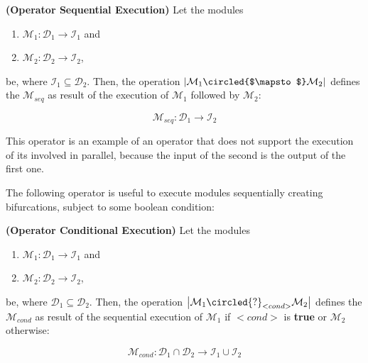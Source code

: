 
\begin{definition}\label{op:seqexec}
{\bf (Operator Sequential Execution)} Let the modules 
\begin{enumerate}%
	\item $\mathcal{M}_1 : \mathcal{D}_1 \rightarrow \mathcal{I}_1$ and 
	\item $\mathcal{M}_2 : \mathcal{D}_2 \rightarrow \mathcal{I}_2$, 
\end{enumerate}%
be, where $\mathcal{I}_1 \subseteq \mathcal{D}_2$. Then, the operation $\left|\mathcal{M}_1\circled{$\mapsto$} \mathcal{M}_2\right|$ defines the \cm{} $\mathcal{M}_{seq}$ as result of the execution of $\mathcal{M}_1$ followed by $\mathcal{M}_2$:

\[
\mathcal{M}_{seq}:\mathcal{D}_1 \rightarrow \mathcal{I}_2
\]
\end{definition}

This operator is an example of an operator that does not support the execution of its involved \cms{} in parallel, because the input of the second \cm{} is the output of the first one.

The following operator is useful to execute modules sequentially creating bifurcations, subject to some boolean condition:

\begin{definition}\label{op:conditional}
{\bf (Operator Conditional Execution)} Let the modules 
\begin{enumerate}%
	\item $\mathcal{M}_1 : \mathcal{D}_1 \rightarrow \mathcal{I}_1$ and  
	\item $\mathcal{M}_2 : \mathcal{D}_2 \rightarrow \mathcal{I}_2$,
\end{enumerate}%
be, where $\mathcal{D}_1 \subseteq \mathcal{D}_2$. %
Then, the operation $\left|\mathcal{M}_1\circled{?}_{<cond>}\mathcal{M}_2\right|$ defines the \cm{} $\mathcal{M}_{cond}$ as result of the sequential execution of $\mathcal{M}_1$ if $<cond>$ is {\bf true} or $\mathcal{M}_2$ otherwise:

\[
\mathcal{M}_{cond}:\mathcal{D}_1\cap\mathcal{D}_2 \rightarrow \mathcal{I}_1 \cup \mathcal{I}_2 
\]
\end{definition}

